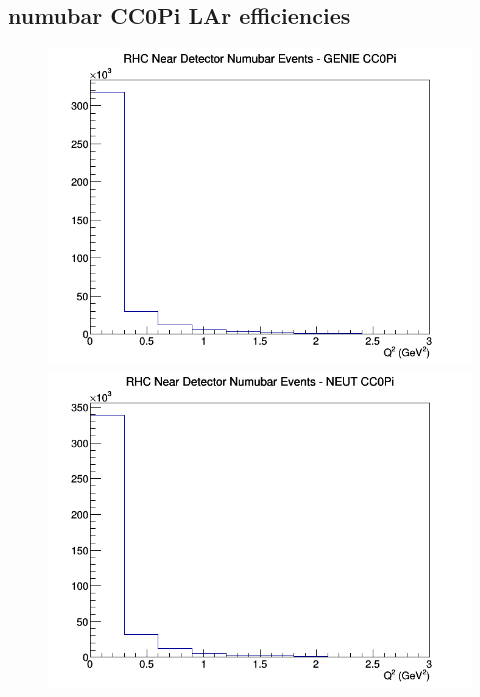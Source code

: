 \documentclass[12pt]{article}
\begin{document}
\subsection{numubar CC0Pi LAr efficiencies}
\begin{figure}[h]
\includegraphics[width=\linewidth]{eff_Q2/LAr/CC0Pi_RHC_ND_numubar_Q2_GENIE.png}
\endminipage
{}
\includegraphics[width=\linewidth]{eff_Q2/LAr/CC0Pi_RHC_ND_numubar_Q2_NEUT.png}
\endminipage
{}

\end{figure}
\end{document}
